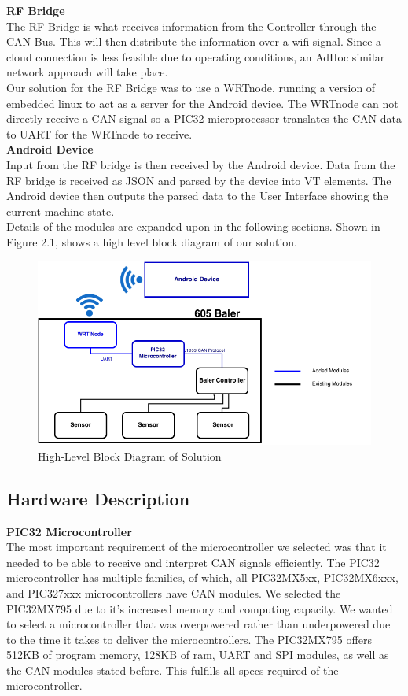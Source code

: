 \documentclass[paper=a4, fontsize=11pt]{scrartcl}
\numberwithin{equation}{section}		%
\numberwithin{figure}{section}			%
\numberwithin{table}{section}				%
\begin{document}
\textbf{RF Bridge} \\
The RF Bridge is what receives information from the Controller through the CAN Bus. This will then distribute the information over a wifi signal. Since a cloud connection is less feasible due to operating conditions,  an AdHoc similar network approach will take place. \\

Our solution for the RF Bridge was to use a WRTnode, running a version of embedded linux to act as a server for the Android device. The WRTnode can not directly receive a CAN signal so a PIC32 microprocessor translates the CAN data to UART for the WRTnode to receive. \\

\textbf{Android Device} \\
Input from the RF bridge is then received by the Android device. Data from the RF bridge is received as JSON and parsed by the device into VT elements. The Android device then outputs the parsed data to the User Interface showing the current machine state. \\

 \pagebreak
 Details of the modules are expanded upon in the following sections. Shown in Figure 2.1, shows a high level block diagram of our solution.  \\
 \begin{figure}[h]
	 \center\includegraphics[scale=0.6]{rev4.png}
 \caption{High-Level Block Diagram of Solution}
 \end{figure}

\subsection{Hardware Description}
\textbf{PIC32 Microcontroller}  \\
The most important requirement of the microcontroller we selected was that it needed to be able to receive and interpret CAN signals efficiently. The PIC32 microcontroller has multiple families, of which, all PIC32MX5xx, PIC32MX6xxx, and PIC327xxx microcontrollers have CAN modules. We selected the PIC32MX795 due to it's increased memory and computing capacity. We wanted to select a microcontroller that was overpowered rather than underpowered due to the time it takes to deliver the microcontrollers. The PIC32MX795 offers 512KB of program memory, 128KB of ram, UART and SPI modules, as well as the CAN modules stated before. This fulfills all specs required of the microcontroller. \\
\end{document}
